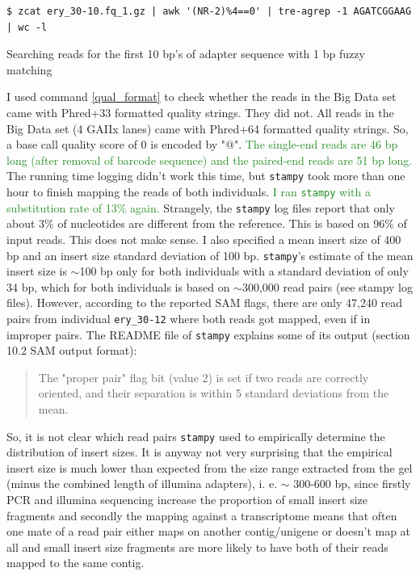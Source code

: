 \documentclass{article}\usepackage[]{graphicx}\usepackage[]{color}
\newcommand{\roger}[1]{ \textcolor[named]{ForestGreen}{#1} }
\begin{document}
\begin{command}
\captionsetup{type=command} %
\begin{Verbatim}
$ zcat ery_30-10.fq_1.gz | awk '(NR-2)%4==0' | tre-agrep -1 AGATCGGAAG | wc -l
\end{Verbatim}
\caption{Searching reads for the first 10 bp's of adapter sequence with 1 bp fuzzy matching}
\label{adapter_fuzzy_grep}
\end{command}

I used command \ref{qual_format} to check whether the reads in the Big Data set came with Phred+33 formatted quality strings. They did not. All reads in the Big Data set (4 GAIIx lanes) came with Phred+64 formatted quality strings. So, a base call quality score of 0 is encoded by "@". \roger{The single-end reads are 46 bp long (after removal of barcode sequence) and the paired-end reads are 51 bp long.} The running time logging didn't work this time, but \texttt{stampy} took more than one hour to finish mapping the reads of both individuals. \roger{I ran \texttt{stampy} with a substitution rate of 13\% again.} Strangely, the \texttt{stampy} log files report that only about 3\% of nucleotides are different from the reference. This is based on 96\% of input reads. This does not make sense. I also specified a mean insert size of 400 bp and an insert size standard deviation of 100 bp. \texttt{stampy}'s estimate of the mean insert size is $\sim$100 bp only for both individuals with a standard deviation of only 34 bp, which for both individuals is based on $\sim$300,000 read pairs (see stampy log files). However, according to the reported SAM flags, there are only 47,240 read pairs from individual \texttt{ery\_30-12} where both reads got mapped, even if in improper pairs. The README file of \texttt{stampy} explains some of its output (section 10.2 SAM output format):
\begin{quote}
\textsf{
The "proper pair" flag bit (value 2) is set if two reads are correctly oriented, and their separation is within 5 standard deviations from the mean.
}
\end{quote}
So, it is not clear which read pairs \texttt{stampy} used to empirically determine the distribution of insert sizes. It is anyway not very surprising that the empirical insert size is much lower than expected from the size range extracted from the gel (minus the combined length of illumina adapters), i. e. $\sim$ 300-600 bp, since firstly PCR and illumina sequencing increase the proportion of small insert size fragments and secondly the mapping against a transcriptome means that often one mate of a read pair either maps on another contig/unigene or doesn't map at all and small insert size fragments are more likely to have both of their reads mapped to the same contig.
\end{document}
